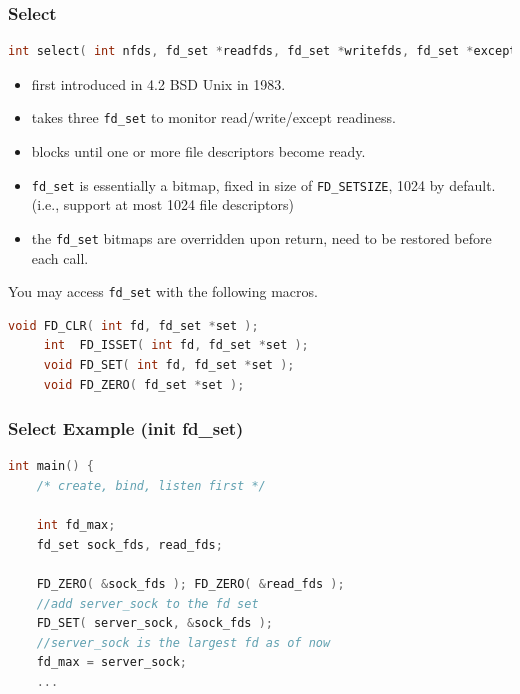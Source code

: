 \documentclass[aspectratio=43]{beamer}
\begin{document}
\begin{frame}[fragile]
  \frametitle{Select}
  \hspace*{2em} \begin{minipage}{.8\textwidth}
  \begin{lstlisting}[language=C++,basicstyle=\ttfamily\footnotesize,commentstyle=\color{commgreen},keywordstyle=\color{blue},breaklines=true]
	int select( int nfds, fd_set *readfds, fd_set *writefds, fd_set *exceptfds, struct timeval *timeout );
   \end{lstlisting}
   \end{minipage}
   \begin{itemize}
	 \item first introduced in 4.2 BSD Unix in 1983.
	 \item takes three {\tt fd\_set} to monitor read/write/except readiness.
	 \item blocks until one or more file descriptors become ready.
	 \item {\tt fd\_set} is essentially a bitmap, fixed in size of {\tt FD\_SETSIZE}, 1024 by default. (i.e., support at most 1024 file descriptors)
	 \item the {\tt fd\_set} bitmaps are overridden upon return, need to be restored before each call.
	 \end{itemize}
    \vspace{1em} 
     \hspace*{2em}\begin{minipage}{.8\textwidth}
   You may access {\tt fd\_set} with the following macros.
   \end{minipage}
     \begin{lstlisting}[language=C++,basicstyle=\ttfamily\footnotesize,commentstyle=\color{commgreen},keywordstyle=\color{blue},breaklines=true]
     void FD_CLR( int fd, fd_set *set );
     int  FD_ISSET( int fd, fd_set *set );
     void FD_SET( int fd, fd_set *set );
     void FD_ZERO( fd_set *set );
   \end{lstlisting}
\end{frame}

\begin{frame}[fragile]
  \frametitle{Select Example (init fd\_set)}
       \begin{lstlisting}[language=C++,basicstyle=\ttfamily\footnotesize,commentstyle=\color{commgreen},keywordstyle=\color{blue},breaklines=true]
int main() {
    /* create, bind, listen first */
    
    int fd_max;
    fd_set sock_fds, read_fds;
    
    FD_ZERO( &sock_fds ); FD_ZERO( &read_fds );
    //add server_sock to the fd set
    FD_SET( server_sock, &sock_fds );
    //server_sock is the largest fd as of now
    fd_max = server_sock;
    ...
    \end{lstlisting}
\end{frame}
\end{document}
